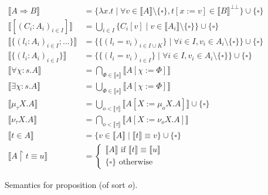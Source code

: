 \begin{figure}
  \begin{align*}
    \llbracket A \Rightarrow B \rrbracket &=
      \{\lambda x.t \;|\; \forall v \in \llbracket A \rrbracket \setminus
      \{\square\},
      t[x := v] \in \llbracket B \rrbracket^{\bot\bot}\} \cup \{\square\}\\
    \llbracket [(C_i : A_i)_{i \in I}] \rrbracket
      &= \bigcup_{i \in I} \{C_i[v] \;|\; v \in \llbracket A_i \rrbracket
           \setminus \{\square\}\} \cup \{\square\}\\
    \llbracket \{(l_i : A_i)_{i \in I}; \dots\} \rrbracket
      &= \{\{(l_i = v_i)_{i \in I \cup K}\} \;|\; \forall i \in I, v_i \in A_i
           \setminus \{\square\}\} \cup \{\square\}\\
    \llbracket \{(l_i : A_i)_{i \in I}\} \rrbracket
      &= \{\{(l_i = v_i)_{i \in I}\} \;|\; \forall i \in I, v_i \in A_i
           \setminus \{\square\}\} \cup \{\square\}\\
    \llbracket \forall \chi:s.A \rrbracket
      &= \bigcap_{\Phi \in \llbracket s \rrbracket}
           \llbracket A[\chi := \Phi] \rrbracket\\
    \llbracket \exists \chi:s.A \rrbracket
      &= \bigcup_{\Phi \in \llbracket s \rrbracket}
           \llbracket A[\chi := \Phi] \rrbracket\\
    \llbracket \mu_\tau X.A \rrbracket
      &= \bigcup_{o < \llbracket \tau \rrbracket}
            \llbracket A[X := \mu_o X.A] \rrbracket \cup \{\square\}\\
    \llbracket \nu_\tau X.A \rrbracket
      &= \bigcap_{o < \llbracket \tau \rrbracket}
            \llbracket A[X := \nu_o X.A] \rrbracket\\
    \llbracket t \in A \rrbracket
      &= \{v \in \llbracket A \rrbracket \;|\; \llbracket t \rrbracket
      \equiv v\} \cup \{\square\}\\
    \llbracket A \restriction t \equiv u \rrbracket
      &= \begin{cases}
           \llbracket A \rrbracket \text{ if } \llbracket t \rrbracket
             \equiv \llbracket u \rrbracket\\
           \{\square\} \text{ otherwise}
         \end{cases}
  \end{align*}
  \caption{Semantics for proposition (of sort $o$).}\label{semomicron}
\end{figure}

